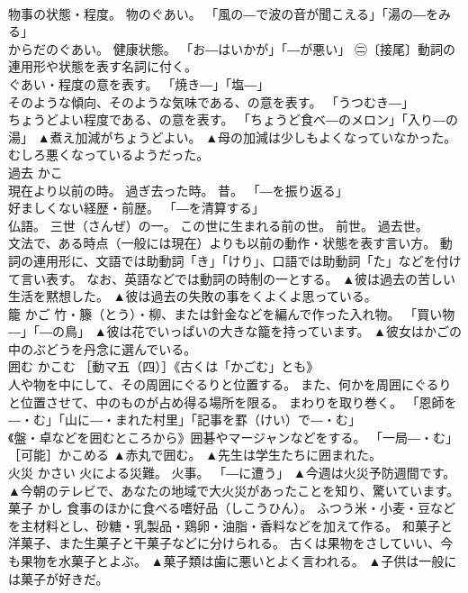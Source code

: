 \documentclass[8pt]{extreport}
\begin{document}
\begin{CJK}{UTF8}{min}
\\	物事の状態・程度。 物のぐあい。 「風の―で波の音が聞こえる」「湯の―をみる」 
\\	からだのぐあい。 健康状態。 「お―はいかが」「―が悪い」 ㊁〔接尾〕動詞の連用形や状態を表す名詞に付く。 
\\	ぐあい・程度の意を表す。 「焼き―」「塩―」 
\\	そのような傾向、そのような気味である、の意を表す。 「うつむき―」 
\\	ちょうどよい程度である、の意を表す。 「ちょうど食べ―のメロン」「入り―の湯」	▲煮え加減がちょうどよい。 ▲母の加減は少しもよくなっていなかった。むしろ悪くなっているようだった。
\\	過去	かこ	
\\	現在より以前の時。 過ぎ去った時。 昔。 「―を振り返る」 
\\	好ましくない経歴・前歴。 「―を清算する」 
\\	仏語。 三世（さんぜ）の一。 この世に生まれる前の世。 前世。 過去世。 
\\	文法で、ある時点（一般には現在）よりも以前の動作・状態を表す言い方。 動詞の連用形に、文語では助動詞「き」「けり」、口語では助動詞「た」などを付けて言い表す。 なお、英語などでは動詞の時制の一とする。	▲彼は過去の苦しい生活を黙想した。 ▲彼は過去の失敗の事をくよくよ思っている。
\\	籠	かご	竹・籐（とう）・柳、または針金などを編んで作った入れ物。 「買い物―」「―の鳥」	▲彼は花でいっぱいの大きな籠を持っています。 ▲彼女はかごの中のぶどうを丹念に選んでいる。
\\	囲む	かこむ	［動マ五（四）］《古くは「かごむ」とも》 
\\	人や物を中にして、その周囲にぐるりと位置する。 また、何かを周囲にぐるりと位置させて、中のものが占め得る場所を限る。 まわりを取り巻く。 「恩師を―・む」「山に―・まれた村里」「記事を罫（けい）で―・む」 
\\	《盤・卓などを囲むところから》囲碁やマージャンなどをする。 「一局―・む」 ［可能］かこめる	▲赤丸で囲む。 ▲先生は学生たちに囲まれた。
\\	火災	かさい	火による災難。 火事。 「―に遭う」	▲今週は火災予防週間です。 ▲今朝のテレビで、あなたの地域で大火災があったことを知り、驚いています。
\\	菓子	かし	食事のほかに食べる嗜好品（しこうひん）。 ふつう米・小麦・豆などを主材料とし、砂糖・乳製品・鶏卵・油脂・香料などを加えて作る。 和菓子と洋菓子、また生菓子と干菓子などに分けられる。 古くは果物をさしていい、今も果物を水菓子とよぶ。	▲菓子類は歯に悪いとよく言われる。 ▲子供は一般には菓子が好きだ。

\end{CJK}
\end{document}
